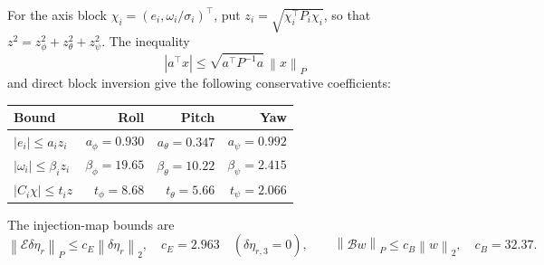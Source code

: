 \documentclass[12pt, a4paper]{article}
\begin{document}
For the axis block $\chi_i=(e_i,\omega_i/\sigma_i)^\top$, put
$z_i=\sqrt{\chi_i^\top P_i\chi_i}$, so that
$z^2=z_\phi^2+z_\theta^2+z_\psi^2$.
The inequality
\begin{equation}
 |a^\top x|\le\sqrt{a^\top P^{-1}a}\,\left\lVert x\right\rVert_{P}
 \label{uhrc:eq:dual}
\end{equation}
and direct block inversion give the following conservative coefficients:
\begin{center}
\begin{tabular}{lrrr}
\toprule
Bound & Roll & Pitch & Yaw\\
\midrule
$|e_i|\le a_i z_i$ & $a_\phi=0.930$ & $a_\theta=0.347$ & $a_\psi=0.992$\\
$|\omega_i|\le \beta_i z_i$ & $\beta_\phi=19.65$ & $\beta_\theta=10.22$ & $\beta_\psi=2.415$\\
$|C_i\chi|\le t_i z$ & $t_\phi=8.68$ & $t_\theta=5.66$ & $t_\psi=2.066$\\
\bottomrule
\end{tabular}
\end{center}
The injection-map bounds are
\begin{equation}
 \left\lVert \mathcal E\delta\eta_r\right\rVert_{P}\le c_E\left\lVert \delta\eta_r\right\rVert_{2},
 \quad c_E=2.963\quad(\delta\eta_{r,3}=0),\qquad
 \left\lVert \mathcal Bw\right\rVert_{P}\le c_B\left\lVert w\right\rVert_{2},\quad c_B=32.37.
 \label{uhrc:eq:injection-bounds}
\end{equation}
\end{document}
